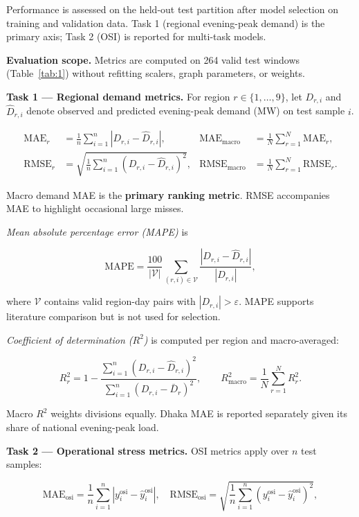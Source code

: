 Performance is assessed on the held-out test partition after model selection on training and validation data. Task 1 (regional evening-peak demand) is the primary axis; Task 2 (OSI) is reported for multi-task models.

\textbf{Evaluation scope.} Metrics are computed on 264 valid test windows (Table~\ref{tab:1}) without refitting scalers, graph parameters, or weights.

\textbf{Task 1 --- Regional demand metrics.} For region \(r \in \{1, \ldots, 9\}\), let \(D_{r,i}\) and \(\hat{D}_{r,i}\) denote observed and predicted evening-peak demand (MW) on test sample \(i\).

\begin{align}
\mathrm{MAE}_r &= \frac{1}{n} \sum_{i=1}^{n} \left| D_{r,i} - \hat{D}_{r,i} \right|, &
\mathrm{MAE}_{\mathrm{macro}} &= \frac{1}{N} \sum_{r=1}^{N} \mathrm{MAE}_r, \\
\mathrm{RMSE}_r &= \sqrt{\frac{1}{n} \sum_{i=1}^{n} \left( D_{r,i} - \hat{D}_{r,i} \right)^2}, &
\mathrm{RMSE}_{\mathrm{macro}} &= \frac{1}{N} \sum_{r=1}^{N} \mathrm{RMSE}_r.
\end{align}

Macro demand MAE is the \textbf{primary ranking metric}. RMSE accompanies MAE to highlight occasional large misses.

\textit{Mean absolute percentage error (MAPE)} is

\[
\mathrm{MAPE} = \frac{100}{|\mathcal{V}|} \sum_{(r,i) \in \mathcal{V}} \frac{\left| D_{r,i} - \hat{D}_{r,i} \right|}{\left| D_{r,i} \right|},
\]

where \(\mathcal{V}\) contains valid region-day pairs with \(|D_{r,i}| > \varepsilon\). MAPE supports literature comparison but is not used for selection.

\textit{Coefficient of determination ($R^2$)} is computed per region and macro-averaged:

\[
R^2_r = 1 - \frac{\sum_{i=1}^{n} \left( D_{r,i} - \hat{D}_{r,i} \right)^2}{\sum_{i=1}^{n} \left( D_{r,i} - \bar{D}_r \right)^2}, \qquad
R^2_{\mathrm{macro}} = \frac{1}{N} \sum_{r=1}^{N} R^2_r.
\]

Macro $R^2$ weights divisions equally. Dhaka MAE is reported separately given its share of national evening-peak load.

\textbf{Task 2 --- Operational stress metrics.} OSI metrics apply over \(n\) test samples:

\[
\mathrm{MAE}_{\mathrm{osi}} = \frac{1}{n} \sum_{i=1}^{n} \left| y^{\mathrm{osi}}_i - \hat{y}^{\mathrm{osi}}_i \right|, \quad
\mathrm{RMSE}_{\mathrm{osi}} = \sqrt{\frac{1}{n} \sum_{i=1}^{n} \left( y^{\mathrm{osi}}_i - \hat{y}^{\mathrm{osi}}_i \right)^2},
\]

